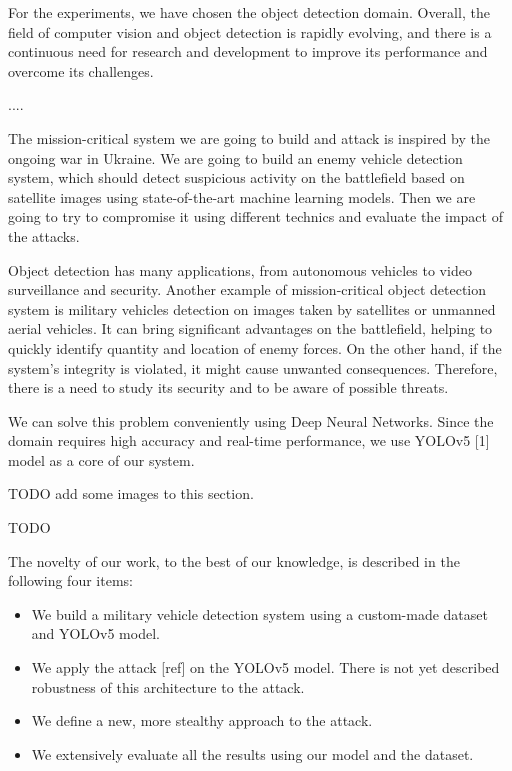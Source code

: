 \documentclass[14pt,a4paper]{extarticle}
\newcounter{e}
\newcounter{pic}
\numberwithin{equation}{section}
\numberwithin{figure}{section}
\begin{document}
For the experiments, we have chosen the object detection domain. Overall, the field of computer vision and object detection is rapidly evolving, and there is a continuous need for research and development to improve its performance and overcome its challenges. 

....

The mission-critical system we are going to build and attack is inspired by the ongoing war in Ukraine. We are going to build an enemy vehicle detection system, which should detect suspicious activity on the battlefield based on satellite images using state-of-the-art machine learning models. Then we are going to try to compromise it using different technics and evaluate the impact of the attacks.


Object detection has many applications, from autonomous vehicles to video surveillance and security. Another example of mission-critical object detection system is military vehicles detection on images taken by satellites or unmanned aerial vehicles. It can bring significant advantages on the battlefield, helping to quickly identify quantity and location of enemy forces. On the other hand, if the system’s integrity is violated, it might cause unwanted consequences. Therefore, there is a need to study its security and to be aware of possible threats.

We can solve this problem conveniently using Deep Neural Networks. Since the domain requires high accuracy and real-time performance, we use YOLOv5 [1] model as a core of our system. 

TODO add some images to this section. 

TODO

The novelty of our work, to the best of our knowledge, is described in the following four items:
\begin{itemize}
    \item We build a military vehicle detection system using a custom-made dataset and YOLOv5 model.
    \item We apply the attack [ref] on the YOLOv5 model. There is not yet described robustness of this architecture to the attack.
    \item We define a new, more stealthy approach to the attack.
    \item We extensively evaluate all the results using our model and the dataset.
    
\end{itemize}

\end{document}
